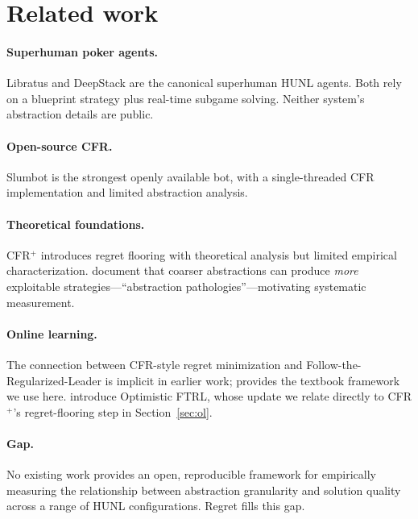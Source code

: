 \section{Related work}
\label{sec:related}

\paragraph{Superhuman poker agents.} Libratus \citep{brown2017libratus} and
DeepStack \citep{moravcik2017deepstack} are the canonical superhuman HUNL
agents. Both rely on a blueprint strategy plus real-time subgame solving.
Neither system's abstraction details are public.

\paragraph{Open-source CFR.} Slumbot \citep{jackson2013} is the strongest
openly available bot, with a single-threaded CFR implementation and limited
abstraction analysis.

\paragraph{Theoretical foundations.} CFR$^+$ \citep{tammelin2014} introduces
regret flooring with theoretical analysis but limited empirical
characterization. \citet{waugh2009pathologies} document that coarser
abstractions can produce \emph{more} exploitable strategies---``abstraction
pathologies''---motivating systematic measurement.

\paragraph{Online learning.} The connection between CFR-style regret
minimization and Follow-the-Regularized-Leader is implicit in earlier work;
\citet{hazan2022oco} provides the textbook framework we use here.
\citet{rakhlin2013optimistic} introduce Optimistic FTRL, whose update we
relate directly to CFR$^+$'s regret-flooring step in Section~\ref{sec:ol}.

\paragraph{Gap.} No existing work provides an open, reproducible framework
for empirically measuring the relationship between abstraction granularity
and solution quality across a range of HUNL configurations. Regret fills
this gap.

